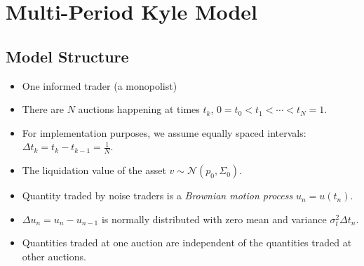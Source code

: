 \documentclass{beamer}
\begin{document}
\section{Multi-Period Kyle Model}
\subsection{Model Structure}

\begin{frame}
    \begin{itemize}
        \item One informed trader (a monopolist)
        \item There are $N$ auctions happening at times $t_k$, $0 = t_0 < t_1 < \cdots < t_N = 1$.
        \item For implementation purposes, we assume equally spaced intervals: $\Delta t_k = t_k - t_{k-1} = \frac{1}{N}$.
        \item The liquidation value of the asset $v \sim \mathcal{N}(p_0, \Sigma_0)$.
    \end{itemize}
\end{frame} 

\begin{frame}
    \begin{itemize}
        \item Quantity traded by noise traders is a \textit{Brownian motion process} $u_n = u(t_n)$.
        \item $\Delta u_n = u_n - u_{n-1}$ is normally distributed with zero mean and variance $\sigma^2_t\Delta t_n$.
        \item Quantities traded at one auction are independent of the quantities traded at other auctions.
    \end{itemize}
\end{frame}
\end{document}
